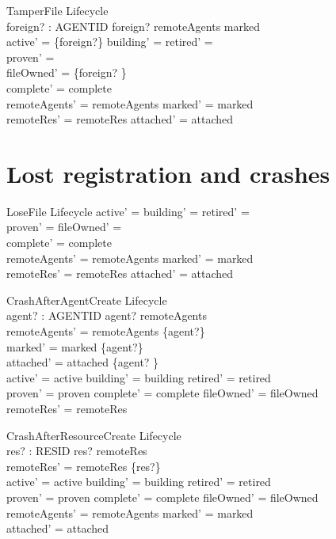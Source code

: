 \documentclass[a4paper,10pt,fleqn]{article}
\begin{document}
\begin{schema}{TamperFile}
  \Delta Lifecycle \\
  foreign? : AGENTID
\where
  foreign? \in remoteAgents \setminus marked \\
  active' = \{foreign?\} \land building' = \emptyset \land retired' = \emptyset \\
  proven' = \emptyset \\
  fileOwned' = \{foreign? \mapsto \emptyset\} \\
  complete' = complete \\
  remoteAgents' = remoteAgents \land marked' = marked \\
  remoteRes' = remoteRes \land attached' = attached
\end{schema}

\section{Lost registration and crashes}

\begin{schema}{LoseFile}
  \Delta Lifecycle
\where
  active' = \emptyset \land building' = \emptyset \land retired' = \emptyset \\
  proven' = \emptyset \land fileOwned' = \emptyset \\
  complete' = complete \\
  remoteAgents' = remoteAgents \land marked' = marked \\
  remoteRes' = remoteRes \land attached' = attached
\end{schema}

\begin{schema}{CrashAfterAgentCreate}
  \Delta Lifecycle \\
  agent? : AGENTID
\where
  agent? \notin remoteAgents \\
  remoteAgents' = remoteAgents \cup \{agent?\} \\
  marked' = marked \cup \{agent?\} \\
  attached' = attached \cup \{agent? \mapsto \emptyset\} \\
  active' = active \land building' = building \land retired' = retired \\
  proven' = proven \land complete' = complete \land fileOwned' = fileOwned \\
  remoteRes' = remoteRes
\end{schema}

\begin{schema}{CrashAfterResourceCreate}
  \Delta Lifecycle \\
  res? : RESID
\where
  res? \notin remoteRes \\
  remoteRes' = remoteRes \cup \{res?\} \\
  active' = active \land building' = building \land retired' = retired \\
  proven' = proven \land complete' = complete \land fileOwned' = fileOwned \\
  remoteAgents' = remoteAgents \land marked' = marked \\
  attached' = attached
\end{schema}
\end{document}
